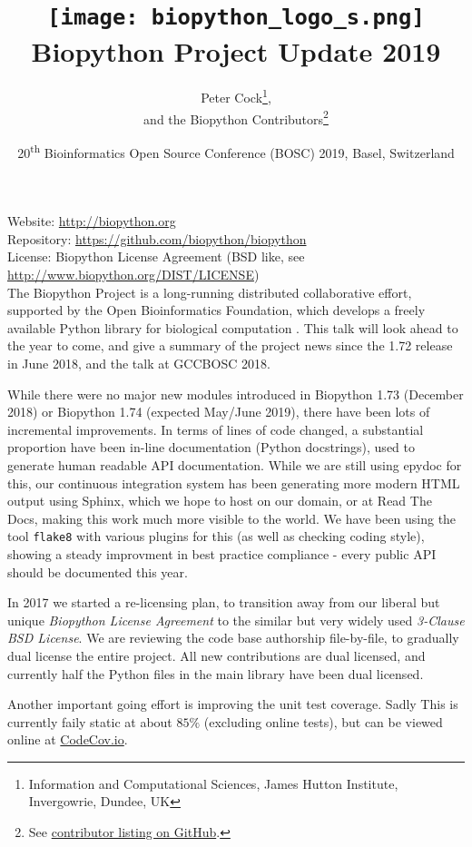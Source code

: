 \documentclass[10pt,oneside]{article}
\title{%
\vspace{-1.5in}
\texttt{[image: biopython\_logo\_s.png]} \\
\vspace{3mm}Biopython Project Update 2019}
\author{
    Peter Cock\thanks{Information and Computational Sciences, James Hutton Institute, Invergowrie, Dundee, UK},\\
    and the Biopython Contributors\thanks{See \href{https://github.com/biopython/biopython/blob/master/CONTRIB.rst}{contributor listing on GitHub}.}}
\date{20\textsuperscript{th} Bioinformatics Open Source Conference (BOSC) 2019, Basel, Switzerland}
\begin{document}
\maketitle
\thispagestyle{empty}

\vspace{-0.2in}
\noindent
Website: \url{http://biopython.org} \\
Repository: \url{https://github.com/biopython/biopython} \\
License: Biopython License Agreement (BSD like, see \url{http://www.biopython.org/DIST/LICENSE}) \\

The Biopython Project is a long-running distributed collaborative effort,
supported by the Open Bioinformatics Foundation, which develops a freely
available Python library for biological computation \cite{AppNote}. This
talk will look ahead to the year to come, and give a summary of the project
news since the 1.72 release in June 2018, and the talk at GCCBOSC 2018.

While there were no major new modules introduced in Biopython 1.73
(December 2018) or Biopython 1.74 (expected May/June 2019), there have
been lots of incremental improvements.
In terms of lines of code changed, a substantial proportion have been
in-line documentation (Python docstrings), used to generate human readable
API documentation. While we are still using epydoc for this, our continuous
integration system has been generating more modern HTML output using Sphinx,
which we hope to host on our domain, or at Read The Docs, making this work
much more visible to the world. We have been using the tool \texttt{flake8}
with various plugins for this (as well as checking coding style), showing
a steady improvment in best practice compliance - every public API should
be documented this year.

In 2017 we started a re-licensing plan, to transition away
from our liberal but unique \emph{Biopython License Agreement} to the similar
but very widely used \emph{3-Clause BSD License}. We are reviewing the code
base authorship file-by-file, to gradually dual license the entire project.
All new contributions are dual licensed, and currently half the Python files
in the main library have been dual licensed.

Another important going effort is improving the unit test coverage. Sadly
This is currently faily static at about $85\%$ (excluding online tests),
but can be viewed online at
\href{https://codecov.io/github/biopython/biopython/}{CodeCov.io}.
\end{document}

